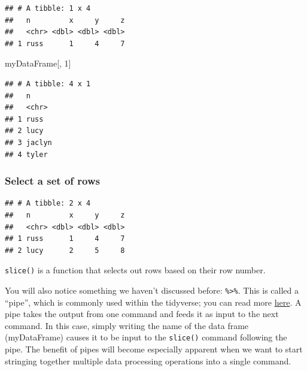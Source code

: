 \documentclass[12pt,]{book}
\newenvironment{Shaded}{\begin{snugshade}}{\end{snugshade}}
\newcommand{\DecValTok}[1]{\textcolor[rgb]{0.00,0.00,0.81}{#1}}
\newcommand{\KeywordTok}[1]{\textcolor[rgb]{0.13,0.29,0.53}{\textbf{#1}}}
\newcommand{\NormalTok}[1]{#1}
\newcommand{\OperatorTok}[1]{\textcolor[rgb]{0.81,0.36,0.00}{\textbf{#1}}}
\newcommand{\StringTok}[1]{\textcolor[rgb]{0.31,0.60,0.02}{#1}}
\begin{document}
\begin{verbatim}
## # A tibble: 1 x 4
##   n         x     y     z
##   <chr> <dbl> <dbl> <dbl>
## 1 russ      1     4     7
\end{verbatim}

\begin{Shaded}
\begin{Highlighting}[]
\NormalTok{myDataFrame[, }\DecValTok{1}\NormalTok{]}
\end{Highlighting}
\end{Shaded}

\begin{verbatim}
## # A tibble: 4 x 1
##   n     
##   <chr> 
## 1 russ  
## 2 lucy  
## 3 jaclyn
## 4 tyler
\end{verbatim}

\hypertarget{select-a-set-of-rows}{%
\subsubsection{Select a set of rows}\label{select-a-set-of-rows}}

\begin{Shaded}
\end{Shaded}

\begin{verbatim}
## # A tibble: 2 x 4
##   n         x     y     z
##   <chr> <dbl> <dbl> <dbl>
## 1 russ      1     4     7
## 2 lucy      2     5     8
\end{verbatim}

\texttt{slice()} is a function that selects out rows based on their row number.

You will also notice something we haven't discussed before: \texttt{\%\textgreater{}\%}. This is called a ``pipe'', which is commonly used within the tidyverse; you can read more \href{http://magrittr.tidyverse.org/}{here}. A pipe takes the output from one command and feeds it as input to the next command. In this case, simply writing the name of the data frame (myDataFrame) causes it to be input to the \texttt{slice()} command following the pipe. The benefit of pipes will become especially apparent when we want to start stringing together multiple data processing operations into a single command.
\end{document}
